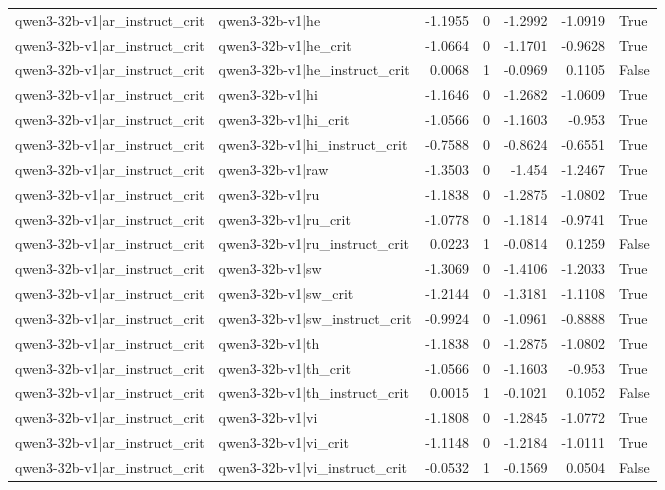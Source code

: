 \begin{table}
\begin{tabular}{l l r r r r l}
qwen3-32b-v1|ar_instruct_crit & qwen3-32b-v1|he & -1.1955 & 0 & -1.2992 & -1.0919 & True \\
qwen3-32b-v1|ar_instruct_crit & qwen3-32b-v1|he_crit & -1.0664 & 0 & -1.1701 & -0.9628 & True \\
qwen3-32b-v1|ar_instruct_crit & qwen3-32b-v1|he_instruct_crit & 0.0068 & 1 & -0.0969 & 0.1105 & False \\
qwen3-32b-v1|ar_instruct_crit & qwen3-32b-v1|hi & -1.1646 & 0 & -1.2682 & -1.0609 & True \\
qwen3-32b-v1|ar_instruct_crit & qwen3-32b-v1|hi_crit & -1.0566 & 0 & -1.1603 & -0.953 & True \\
qwen3-32b-v1|ar_instruct_crit & qwen3-32b-v1|hi_instruct_crit & -0.7588 & 0 & -0.8624 & -0.6551 & True \\
qwen3-32b-v1|ar_instruct_crit & qwen3-32b-v1|raw & -1.3503 & 0 & -1.454 & -1.2467 & True \\
qwen3-32b-v1|ar_instruct_crit & qwen3-32b-v1|ru & -1.1838 & 0 & -1.2875 & -1.0802 & True \\
qwen3-32b-v1|ar_instruct_crit & qwen3-32b-v1|ru_crit & -1.0778 & 0 & -1.1814 & -0.9741 & True \\
qwen3-32b-v1|ar_instruct_crit & qwen3-32b-v1|ru_instruct_crit & 0.0223 & 1 & -0.0814 & 0.1259 & False \\
qwen3-32b-v1|ar_instruct_crit & qwen3-32b-v1|sw & -1.3069 & 0 & -1.4106 & -1.2033 & True \\
qwen3-32b-v1|ar_instruct_crit & qwen3-32b-v1|sw_crit & -1.2144 & 0 & -1.3181 & -1.1108 & True \\
qwen3-32b-v1|ar_instruct_crit & qwen3-32b-v1|sw_instruct_crit & -0.9924 & 0 & -1.0961 & -0.8888 & True \\
qwen3-32b-v1|ar_instruct_crit & qwen3-32b-v1|th & -1.1838 & 0 & -1.2875 & -1.0802 & True \\
qwen3-32b-v1|ar_instruct_crit & qwen3-32b-v1|th_crit & -1.0566 & 0 & -1.1603 & -0.953 & True \\
qwen3-32b-v1|ar_instruct_crit & qwen3-32b-v1|th_instruct_crit & 0.0015 & 1 & -0.1021 & 0.1052 & False \\
qwen3-32b-v1|ar_instruct_crit & qwen3-32b-v1|vi & -1.1808 & 0 & -1.2845 & -1.0772 & True \\
qwen3-32b-v1|ar_instruct_crit & qwen3-32b-v1|vi_crit & -1.1148 & 0 & -1.2184 & -1.0111 & True \\
qwen3-32b-v1|ar_instruct_crit & qwen3-32b-v1|vi_instruct_crit & -0.0532 & 1 & -0.1569 & 0.0504 & False \\

\end{tabular}
\end{table}
